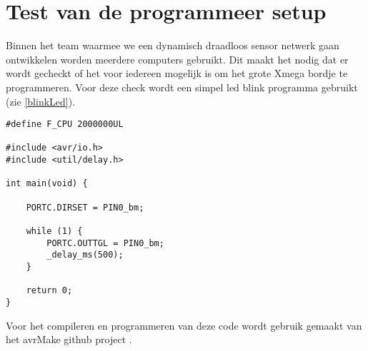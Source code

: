 \section{Test van de programmeer setup}

Binnen het team waarmee we een dynamisch draadloos sensor netwerk gaan ontwikkelen worden meerdere computers gebruikt. Dit maakt het nodig dat er wordt gecheckt of het voor iedereen mogelijk is om het grote Xmega bordje te programmeren. Voor deze check wordt een simpel led blink programma gebruikt (zie \autoref{blinkLed}).

\begin{minipage}{\linewidth}
    
    \begin{lstlisting}[caption={blink.c},captionpos=b,label={blinkLed},style=c]
#define F_CPU 2000000UL

#include <avr/io.h>
#include <util/delay.h>

int main(void) {
    
    PORTC.DIRSET = PIN0_bm;
    
    while (1) {
        PORTC.OUTTGL = PIN0_bm;
        _delay_ms(500);
    }
        
    return 0;
}
    \end{lstlisting}
\end{minipage}

Voor het compileren en programmeren van deze code wordt gebruik gemaakt van het avrMake github project \autocite{avrMake}.